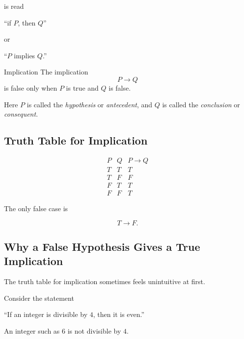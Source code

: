 is read

\begin{center}
``if \(P\), then \(Q\)''
\end{center}

or

\begin{center}
``\(P\) implies \(Q\).''
\end{center}

\begin{definitionbox}{Implication}
The implication
\[ P\to Q \]
is false only when \(P\) is true and \(Q\) is false.
\end{definitionbox}

Here \(P\) is called the \emph{hypothesis} or \emph{antecedent}, and \(Q\)
is called the \emph{conclusion} or \emph{consequent}.

\subsection{Truth Table for Implication}
\label{subsec:implication-truth-table}

\[
\begin{array}{c|c|c}
P & Q & P\to Q\\ \hline
T & T & T\\
T & F & F\\
F & T & T\\
F & F & T
\end{array}
\]

The only false case is

\[ T\to F. \]

\subsection{Why a False Hypothesis Gives a True Implication}
\label{subsec:false-hypothesis-implication}

The truth table for implication sometimes feels unintuitive at first.

Consider the statement

\begin{center}
``If an integer is divisible by \(4\), then it is even.''
\end{center}

An integer such as \(6\) is not divisible by \(4\).

